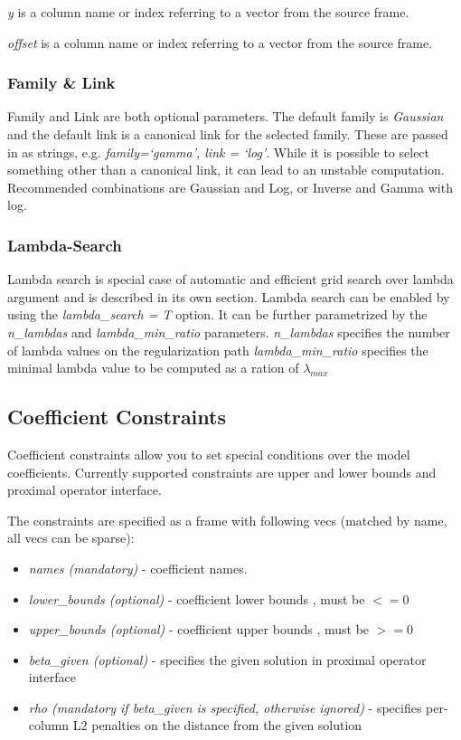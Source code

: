 \documentclass[11pt]{article}
\begin{document}
\textit{y} is a column name or index referring to a vector from the source frame.

\textit{offset} is a column name or index referring to a vector from the source frame.
  
\subsubsection{Family \& Link}
Family and Link are both optional parameters. The default family is \textit{Gaussian} and the default link is a canonical link for the selected family. These are passed in as strings, e.g. \textit{family=`gamma', link = `log'}.
While it is possible to select something other than a canonical link, it can lead to an unstable computation. Recommended combinations are Gaussian and Log, or Inverse and Gamma with log.  



\subsubsection{Lambda-Search}
Lambda search is special case of automatic and efficient grid search over lambda argument and is described in its own section. Lambda search can be enabled by using the \textit{lambda\_search = T} option. It can be further parametrized by the \textit{n\_lambdas} and \textit{lambda\_min\_ratio} parameters. 
\textit{n\_lambdas} specifies the number of lambda values on the regularization path
\textit{lambda\_min\_ratio} specifies the minimal lambda value to be computed as a ration of $\lambda_{max}$

\subsection{Coefficient Constraints}
Coefficient constraints allow you to set special conditions over the model coefficients. Currently supported constraints are upper and lower bounds and proximal operator \cite{prox} interface. 

The constraints are specified as a frame with following vecs (matched by name, all vecs can be sparse):
\begin{itemize}
\item \textit{names (mandatory)}  - coefficient names. 
\item \textit{lower\_bounds (optional)} - coefficient lower bounds , must be $<= 0$
\item \textit{upper\_bounds (optional)} - coefficient upper bounds , must be $>= 0$
\item \textit{beta\_given (optional)} - specifies the given solution in proximal operator interface
\item \textit{rho (mandatory if beta\_given is specified, otherwise ignored)} - specifies per-column L2 penalties on the distance from the given solution
\end{itemize}
 
\end{document}
